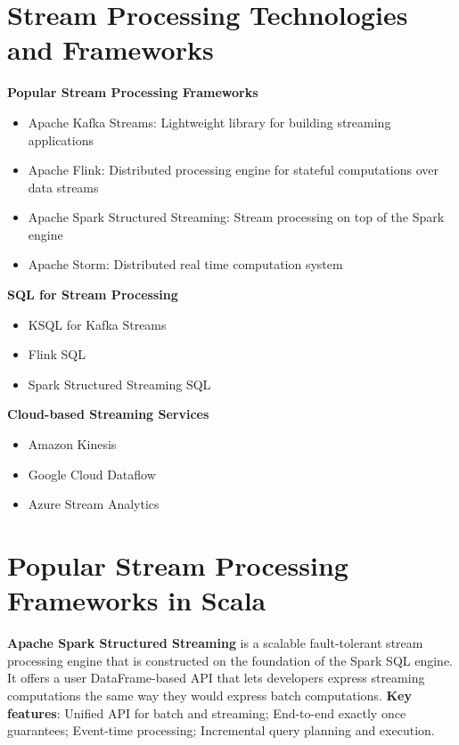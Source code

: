 \section{Stream Processing Technologies and Frameworks}

\textbf{Popular Stream Processing Frameworks}

\begin{itemize}
    \item Apache Kafka Streams: Lightweight library for building streaming applications
    \item Apache Flink: Distributed processing engine for stateful computations over data streams
    \item Apache Spark Structured Streaming: Stream processing on top of the Spark engine
    \item Apache Storm: Distributed real time computation system
\end{itemize}

\textbf{SQL for Stream Processing}

\begin{itemize}
    \item KSQL for Kafka Streams
    \item Flink SQL
    \item Spark Structured Streaming SQL
\end{itemize}

\textbf{Cloud-based Streaming Services}

\begin{itemize}
    \item Amazon Kinesis
    \item Google Cloud Dataflow
    \item Azure Stream Analytics
\end{itemize}

\section{Popular Stream Processing Frameworks in Scala}

\textbf{Apache Spark Structured Streaming} is a scalable fault-tolerant stream processing engine that is constructed on the foundation of the Spark SQL engine. It offers a user DataFrame-based API that lets developers express streaming computations the same way they would express batch computations. \textbf{Key features}: Unified API for batch and streaming; End-to-end exactly once guarantees; Event-time processing; Incremental query planning and execution.

